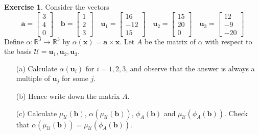 \documentclass{amsart}
\newcommand{\R}         {{\mathbb{R}}}
\newcommand{\bsm}       {\left[\begin{smallmatrix}}
\newcommand{\esm}       {\end{smallmatrix}\right]}
\newcommand{\al}        {\alpha}
\newcommand{\tm}        {\times}
\newcommand{\va}        {\mathbf{a}}
\newcommand{\vb}        {\mathbf{b}}
\newcommand{\vu}        {\mathbf{u}}
\newcommand{\vx}        {\mathbf{x}}
\newcommand{\CU}        {{\mathcal{U}}}
\renewcommand{\:}       {\colon}
\theoremstyle{definition}
\newtheorem{exercise}{Exercise}[section]
\begin{document}
\begin{exercise}
 Consider the vectors
 \[ \va   = \bsm  3\\  4\\  0\esm \hspace{1em}
    \vb   = \bsm  1\\  2\\  3\esm \hspace{1em}
    \vu_1 = \bsm 16\\-12\\ 15\esm \hspace{1em}
    \vu_2 = \bsm 15\\ 20\\  0\esm \hspace{1em}
    \vu_3 = \bsm 12\\ -9\\-20\esm 
 \] 
 Define $\al\:\R^3\to\R^3$ by $\al(\vx)=\va\tm\vx$.  Let $A$
 be the matrix of $\al$ with respect to the basis
 $\CU=\vu_1,\vu_2,\vu_3$.  
 \begin{itemize}
  \item[(a)] Calculate $\al(\vu_i)$ for $i=1,2,3$, and observe
   that the answer is always a multiple of $\vu_j$ for some
   $j$.
  \item[(b)] Hence write down the matrix $A$. 
  \item[(c)] Calculate $\mu_{\CU}(\vb)$,
   $\al(\mu_\CU(\vb))$, $\phi_A(\vb)$ and
   $\mu_\CU(\phi_A(\vb))$.  Check that
   $\al(\mu_{\CU}(\vb))=\mu_\CU(\phi_A(\vb))$.
 \end{itemize}
\end{exercise}
\end{document}
